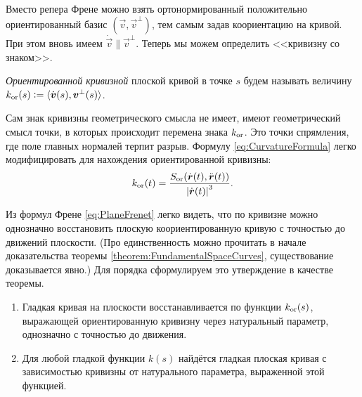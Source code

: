 
Вместо репера Френе можно взять ортонормированный положительно ориентированный базис $(\vec{v}, \vec{v}^{\perp})$, тем самым задав коориентацию на кривой. При этом вновь имеем $\dot{\vec{v}} \parallel \vec{v}^{\perp}$. Теперь мы можем определить <<кривизну со знаком>>.

\begin{definition}
	\textit{Ориентированной кривизной} плоской кривой в точке $s$ будем называть величину $k_{\mathrm{or}}(s) \vcentcolon = \langle\dot{\boldsymbol{v}}(s), \boldsymbol{v}^\perp(s)\rangle$.
\end{definition}

Сам знак кривизны геометрического смысла не имеет, имеют геометрический смысл точки, в которых происходит перемена знака $k_{\mathrm{or}}$. Это точки спрямления, где поле главных нормалей терпит разрыв. Формулу \eqref{eq:CurvatureFormula} легко модифицировать для нахождения ориентированной кривизны:
\begin{equation} \label{eq:OrientedCurvature}
	k_{\mathrm{or}}(t) = \frac{S_{\mathrm{or}}(\dot{\boldsymbol{r}}(t), \ddot{\boldsymbol{r}}(t))}{\left\lvert\dot{\boldsymbol{r}}(t)\right\rvert^3}.
\end{equation}

Из формул Френе \eqref{eq:PlaneFrenet} легко видеть, что по кривизне можно однозначно восстановить плоскую коориентированную кривую с точностью до движений плоскости. (Про единственность можно прочитать в начале доказательства теоремы \ref{theorem:FundamentalSpaceCurves}, существование доказывается явно.) Для порядка сформулируем это утверждение в качестве теоремы.

\begin{theorem} \label{theorem:FundamentalPlaneCurves}
	\begin{enumerate}[nolistsep, label=(\arabic*)]
		\item Гладкая кривая на плоскости восстанавливается по функции $k_{\mathrm{or}}(s)$, выражающей ориентированную кривизну через натуральный параметр, однозначно с точностью до движения.
		\item Для любой гладкой функции $k(s)$ найдётся гладкая плоская кривая с зависимостью кривизны от натурального параметра, выраженной этой функцией.
	\end{enumerate}
\end{theorem}

